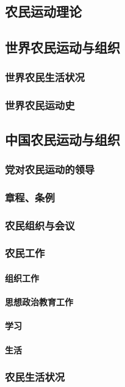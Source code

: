 \documentclass[UTF8]{../RepresentationUniverse}
\begin{document}
\subsection{农民运动理论}
\subsection{世界农民运动与组织}
    \subsubsection{世界农民生活状况}
    \subsubsection{世界农民运动史}

\subsection{中国农民运动与组织}
    \subsubsection{党对农民运动的领导}
    \subsubsection{章程、条例}
    \subsubsection{农民组织与会议}
    \subsubsection{农民工作}
        \paragraph{组织工作}
        \paragraph{思想政治教育工作}
        \paragraph{学习}
        \paragraph{生活}
        
    \subsubsection{农民生活状况}
\end{document}
